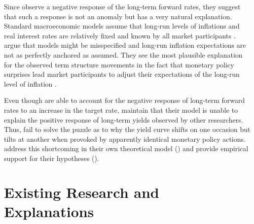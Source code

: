 \documentclass[11pt,a4paper,english,oneside]{book}
\numberwithin{equation}{chapter}
\begin{document}
Since \citeauthor{Gurkaynak.2005} observe a negative response of the long-term forward rates, they suggest that such a response is not an anomaly but has a very natural explanation. 
Standard macroeconomic models assume that long-run levels of inflations and real interest rates are relatively fixed and known by all market participants \citep[p. 425]{Gurkaynak.2005}. \citeauthor{Gurkaynak.2005} argue that models might be misspecified and long-run inflation expectations are not as perfectly anchored as assumed. They see the most plausible explanation for the observed term structure movements in the fact that monetary policy surprises lead market participants to adjust their expectations of the long-run level of inflation \citep[pp. 434--435]{Gurkaynak.2005}.

Even though \cite{Gurkaynak.2005} are able to account for the negative response of long-term forward rates to an increase in the target rate, \citet[p. 2]{Ellingsen.2004} maintain that their model is unable to explain the positive response of long-term yields observed by other researchers. Thus, \cite{Gurkaynak.2005} fail to solve the puzzle as to why the yield curve shifts on one occasion but tilts at another when provoked by apparently identical monetary policy actions. \citeauthor{Ellingsen.2003} address this shortcoming in their own theoretical model (\citeyear{Ellingsen.2001}) and provide empirical support for their hypotheses (\citeyear{Ellingsen.2003}). 


\section{Existing Research and Explanations} \label{ExistingResearch}
\end{document}
